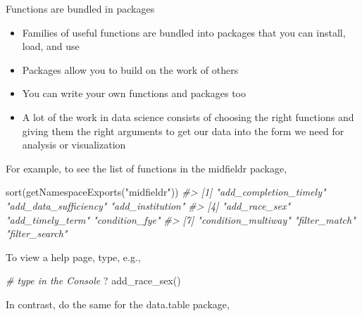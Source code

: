\documentclass[
]{book}
\newenvironment{Shaded}{\begin{snugshade}}{\end{snugshade}}
\newcommand{\CommentTok}[1]{\textcolor[rgb]{0.56,0.35,0.01}{\textit{#1}}}
\newcommand{\FunctionTok}[1]{\textcolor[rgb]{0.00,0.00,0.00}{#1}}
\newcommand{\NormalTok}[1]{#1}
\newcommand{\StringTok}[1]{\textcolor[rgb]{0.31,0.60,0.02}{#1}}
\providecommand{\tightlist}{%
  \setlength{\itemsep}{0pt}\setlength{\parskip}{0pt}}
\begin{document}
Functions are bundled in packages

\begin{itemize}
\tightlist
\item
  Families of useful functions are bundled into packages that you can install, load, and use
\item
  Packages allow you to build on the work of others
\item
  You can write your own functions and packages too
\item
  A lot of the work in data science consists of choosing the right functions and giving them the right arguments to get our data into the form we need for analysis or visualization
\end{itemize}

For example, to see the list of functions in the midfieldr package,

\begin{Shaded}
\begin{Highlighting}[]
\FunctionTok{sort}\NormalTok{(}\FunctionTok{getNamespaceExports}\NormalTok{(}\StringTok{"midfieldr"}\NormalTok{))}
\CommentTok{\#\textgreater{} [1] "add\_completion\_timely" "add\_data\_sufficiency"  "add\_institution"      }
\CommentTok{\#\textgreater{} [4] "add\_race\_sex"          "add\_timely\_term"       "condition\_fye"        }
\CommentTok{\#\textgreater{} [7] "condition\_multiway"    "filter\_match"          "filter\_search"}
\end{Highlighting}
\end{Shaded}

To view a help page, type, e.g.,

\begin{Shaded}
\begin{Highlighting}[]
\CommentTok{\# type in the Console}
\NormalTok{? }\FunctionTok{add\_race\_sex}\NormalTok{() }
\end{Highlighting}
\end{Shaded}

In contrast, do the same for the data.table package,
\end{document}

